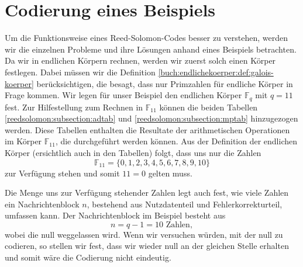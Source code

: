 %
%
%
\section{Codierung eines Beispiels
\label{reedsolomon:section:codebsp}}

Um die Funktionsweise eines Reed-Solomon-Codes besser zu verstehen, werden wir die einzelnen Probleme und ihre Lösungen anhand eines Beispiels betrachten.
Da wir in endlichen Körpern rechnen, werden wir zuerst solch einen Körper festlegen. Dabei müssen wir die Definition \ref{buch:endlichekoerper:def:galois-koerper} berücksichtigen, die besagt, dass nur Primzahlen für endliche Körper in Frage kommen.
Wir legen für unser Beispiel den endlichen Körper $\mathbb{F}_{q}$ mit $q = 11$ fest.
Zur Hilfestellung zum Rechnen in $\mathbb{F}_{11}$ können die beiden Tabellen \ref{reedsolomon:subsection:adtab} und \ref{reedsolomon:subsection:mptab} hinzugezogen werden. Diese Tabellen enthalten die Resultate der arithmetischen Operationen im Körper $\mathbb{F}_{11}$, die durchgeführt werden können.
Aus der Definition der endlichen Körper (ersichtlich auch in den Tabellen) folgt, dass uns nur die Zahlen \[\mathbb{F}_{11} = \{0,1,2,3,4,5,6,7,8,9,10\}\] zur Verfügung stehen und somit $11 = 0$ gelten muss.


%
%

Die Menge uns zur Verfügung stehender Zahlen legt auch fest, wie viele Zahlen ein Nachrichtenblock $n$, bestehend aus Nutzdatenteil und Fehlerkorrekturteil, umfassen kann.
Der Nachrichtenblock im Beispiel besteht aus
\[
n = q - 1 = 10 \text{ Zahlen},
\]
wobei die null weggelassen wird. Wenn wir versuchen würden, mit der null zu codieren, so stellen wir fest, dass wir wieder null an der gleichen Stelle erhalten und somit wäre die Codierung nicht eindeutig.



